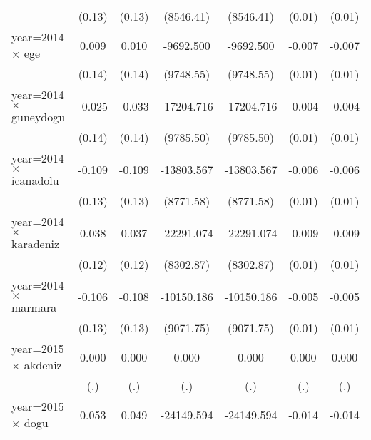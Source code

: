 {\begin{tabular}{l*{6}{c}}
                    &      (0.13)         &      (0.13)         &   (8546.41)         &   (8546.41)         &      (0.01)         &      (0.01)         \\
year=2014 $\times$ ege&       0.009         &       0.010         &   -9692.500         &   -9692.500         &      -0.007         &      -0.007         \\
                    &      (0.14)         &      (0.14)         &   (9748.55)         &   (9748.55)         &      (0.01)         &      (0.01)         \\
year=2014 $\times$ guneydogu&      -0.025         &      -0.033         &  -17204.716         &  -17204.716         &      -0.004         &      -0.004         \\
                    &      (0.14)         &      (0.14)         &   (9785.50)         &   (9785.50)         &      (0.01)         &      (0.01)         \\
year=2014 $\times$ icanadolu&      -0.109         &      -0.109         &  -13803.567         &  -13803.567         &      -0.006         &      -0.006         \\
                    &      (0.13)         &      (0.13)         &   (8771.58)         &   (8771.58)         &      (0.01)         &      (0.01)         \\
year=2014 $\times$ karadeniz&       0.038         &       0.037         &  -22291.074\sym{**} &  -22291.074\sym{**} &      -0.009         &      -0.009         \\
                    &      (0.12)         &      (0.12)         &   (8302.87)         &   (8302.87)         &      (0.01)         &      (0.01)         \\
year=2014 $\times$ marmara&      -0.106         &      -0.108         &  -10150.186         &  -10150.186         &      -0.005         &      -0.005         \\
                    &      (0.13)         &      (0.13)         &   (9071.75)         &   (9071.75)         &      (0.01)         &      (0.01)         \\
year=2015 $\times$ akdeniz&       0.000         &       0.000         &       0.000         &       0.000         &       0.000         &       0.000         \\
                    &         (.)         &         (.)         &         (.)         &         (.)         &         (.)         &         (.)         \\
year=2015 $\times$ dogu&       0.053         &       0.049         &  -24149.594\sym{**} &  -24149.594\sym{**} &      -0.014         &      -0.014         \\

\end{tabular}}
